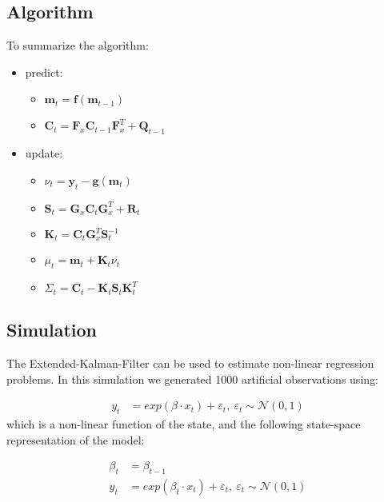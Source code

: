 \documentclass[
]{article}
\providecommand{\tightlist}{%
  \setlength{\itemsep}{0pt}\setlength{\parskip}{0pt}}
\begin{document}
\hypertarget{algorithm-1}{%
\subsection{Algorithm}\label{algorithm-1}}

To summarize the algorithm:

\begin{itemize}
\tightlist
\item
  predict:

  \begin{itemize}
  \tightlist
  \item
    \(\textbf{m}_t = \textbf{f}(\textbf{m}_{t-1})\)
  \item
    \(\textbf{C}_t = \textbf{F}_x\textbf{C}_{t-1}\textbf{F}_x^T + \textbf{Q}_{t-1}\)
  \end{itemize}
\item
  update:

  \begin{itemize}
  \tightlist
  \item
    \(\nu_t = \textbf{y}_t - \textbf{g}(\textbf{m}_{t})\)
  \item
    \(\textbf{S}_t = \textbf{G}_x\textbf{C}_t\textbf{G}_x^T + \textbf{R}_t\)
  \item
    \(\textbf{K}_t = \textbf{C}_t \textbf{G}_x^T\textbf{S}_t^{-1}\)
  \item
    \(\mu_t = \textbf{m}_t + \textbf{K}_t\nu_t\)
  \item
    \(\Sigma_t = \textbf{C}_t-\textbf{K}_t\textbf{S}_t\textbf{K}_t^T\)
  \end{itemize}
\end{itemize}

\hypertarget{simulation}{%
\subsection{Simulation}\label{simulation}}

The Extended-Kalman-Filter can be used to estimate non-linear regression
problems. In this simulation we generated 1000 artificial observations
using:

\[
\begin{align*}
    y_t &= exp(\beta \cdot x_t) + \varepsilon_t, \ \varepsilon_t \sim \mathcal{N}(0,1)
\end{align*}
\] which is a non-linear function of the state, and the following
state-space representation of the model:

\[
\begin{align*}
    \beta_t &= \beta_{t-1} \\
    y_t &= exp(\beta_t \cdot x_t) + \varepsilon_t, \ \varepsilon_t \sim \mathcal{N}(0,1)
\end{align*}
\]
\end{document}
